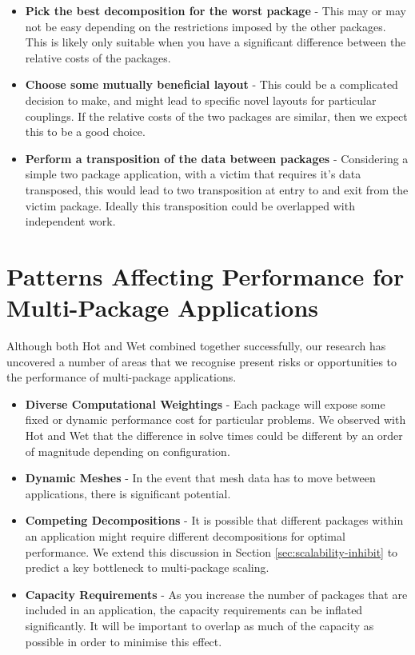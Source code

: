 \documentclass[runningheads,a4paper]{llncs}
\begin{document}
\begin{itemize}
  \item \textbf{Pick the best decomposition for the worst package} - This may or may not be easy depending on the restrictions imposed by the other packages. This is likely only suitable when you have a significant difference between the relative costs of the packages.
  \item \textbf{Choose some mutually beneficial layout} - This could be a complicated decision to make, and might lead to specific novel layouts for particular couplings. If the relative costs of the two packages are similar, then we expect this to be a good choice.
  \item \textbf{Perform a transposition of the data between packages} - Considering a simple two package application, with a victim that requires it's data transposed, this would lead to two transposition at entry to and exit from the victim package. Ideally this transposition could be overlapped with independent work.
\end{itemize}

\section{Patterns Affecting Performance for Multi-Package Applications}

Although both Hot and Wet combined together successfully, our research has uncovered a number of areas that we recognise present risks or opportunities to the performance of multi-package applications. 

\begin{itemize}
  \item \textbf{Diverse Computational Weightings} - Each package will expose some fixed or dynamic performance cost for particular problems. We observed with Hot and Wet that the difference in solve times could be different by an order of magnitude depending on configuration.
  \item \textbf{Dynamic Meshes} - In the event that mesh data has to move between applications, there is significant potential.
  \item \textbf{Competing Decompositions} - It is possible that different packages within an application might require different decompositions for optimal performance. We extend this discussion in Section \ref{sec:scalability-inhibit} to predict a key bottleneck to multi-package scaling.
  \item \textbf{Capacity Requirements} - As you increase the number of packages that are included in an application, the capacity requirements can be inflated significantly. It will be important to overlap as much of the capacity as possible in order to minimise this effect.
\end{itemize}
\end{document}

